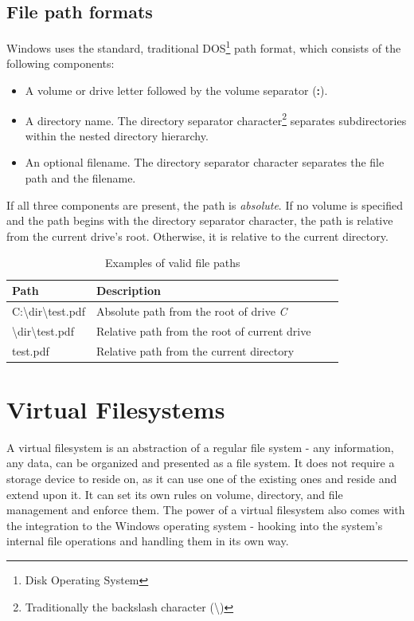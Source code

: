 \subsection*{File path formats}
Windows uses the standard, traditional DOS\footnote{Disk Operating System} path format, which consists of the following components:

\begin{itemize}
    \item A volume or drive letter followed by the volume separator (\textbf{:}).
    \item A directory name. The directory separator character\footnote{Traditionally the backslash character (\textbackslash{})} separates subdirectories within the nested directory hierarchy.
    \item An optional filename. The directory separator character separates the file path and the filename.
\end{itemize}

If all three components are present, the path is \textit{absolute}. If no volume is specified and the path begins with the directory separator character, the path is relative from the current drive's root. Otherwise, it is relative to the current directory.\cite{WinPathFormats}

\begin{table}[!hbt]
\centering
\caption{Examples of valid file paths}
\label{filepathsex}
\begin{tabular}{|l|l|l|l|}
\hline
\textbf{Path} & \textbf{Description} \\ \hline
C:\textbackslash{}dir\textbackslash{}test.pdf       & Absolute path from the root of drive \textit{C}    \\ \hline
\textbackslash{}dir\textbackslash{}test.pdf      & Relative path from the root of current drive     \\ \hline
test.pdf       & Relative path from the current directory     \\ \hline
\end{tabular}
\end{table}

\section{Virtual Filesystems}
\label{vfs}
A virtual filesystem is an abstraction of a regular file system - any information, any data, can be organized and presented as a file system. It does not require a storage device to reside on, as it can use one of the existing ones and reside and extend upon it. It can set its own rules on volume, directory, and file management and enforce them. The power of a virtual filesystem also comes with the integration to the Windows operating system - hooking into the system's internal file operations and handling them in its own way.

